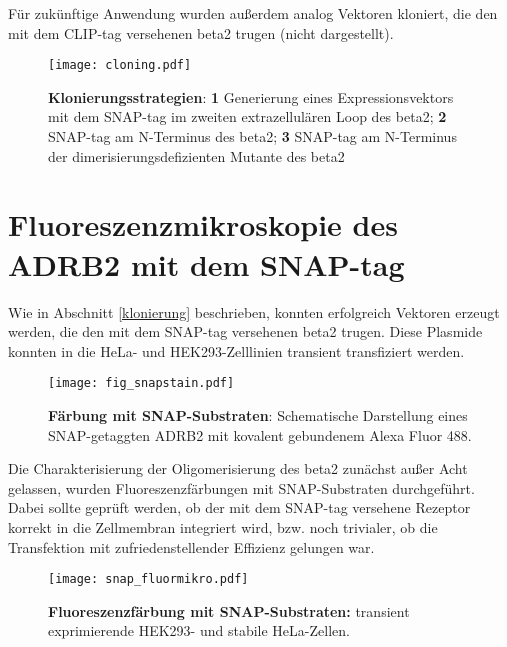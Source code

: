 Für zukünftige Anwendung wurden außerdem analog Vektoren kloniert, die den mit dem CLIP-tag versehenen \gls{beta2} trugen (nicht dargestellt). 

\begin{figure}[htbp]
	\centering
    \texttt{[image: cloning.pdf]}
    \caption{\textbf{Klonierungsstrategien}: \textbf{1} Generierung eines Expressionsvektors mit dem SNAP-tag im zweiten extrazellulären Loop des \gls{beta2}; \textbf{2} SNAP-tag am N-Terminus des \gls{beta2}; \textbf{3} SNAP-tag am N-Terminus der dimerisierungsdefizienten Mutante des \gls{beta2}}
  
    \label{fig:klonierung}
\end{figure}

\section{Fluoreszenzmikroskopie des ADRB2 mit dem SNAP-tag}
\label{snapmikro}
Wie in Abschnitt \ref{klonierung} beschrieben, konnten erfolgreich Vektoren erzeugt werden, die den mit dem SNAP-tag versehenen \gls{beta2} trugen. Diese Plasmide konnten in die HeLa- und HEK293-Zelllinien transient transfiziert werden.

\begin{figure}[htbp]
	\centering
    \texttt{[image: fig\_snapstain.pdf]}
    \caption{\textbf{Färbung mit SNAP-Substraten}: Schematische Darstellung eines SNAP-getaggten ADRB2 mit kovalent gebundenem Alexa Fluor 488.}
  
    \label{fig:scheme_snapstain}
\end{figure}

Die Charakterisierung der Oligomerisierung des \gls{beta2} zunächst außer Acht gelassen, wurden Fluoreszenzfärbungen mit SNAP-Substraten durchgeführt. Dabei sollte geprüft werden, ob der mit dem SNAP-tag versehene Rezeptor korrekt in die Zellmembran integriert wird, bzw. noch trivialer, ob die Transfektion mit zufriedenstellender Effizienz gelungen war.

\begin{figure}[h!tbp]
	\centering
    \texttt{[image: snap\_fluormikro.pdf]}
    \caption{\textbf{Fluoreszenzfärbung mit SNAP-Substraten:} transient exprimierende HEK293- und stabile HeLa-Zellen.}
    \label{fig:stainsnap}
\end{figure}

